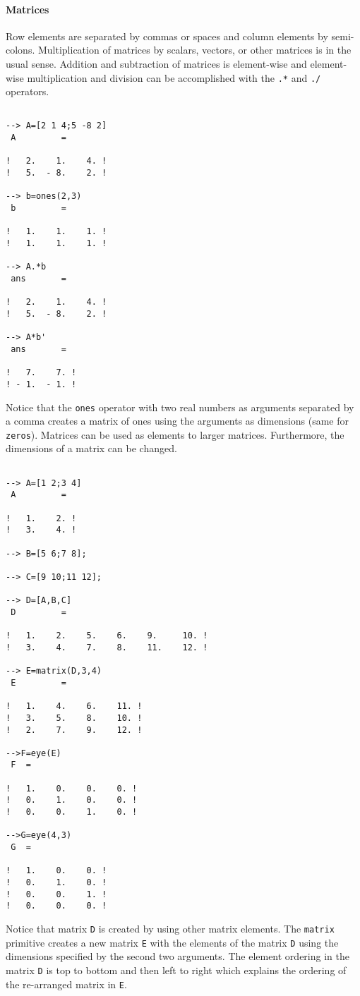 \paragraph{Matrices}
Row elements are separated by commas or spaces
 and column elements by semi-colons.  Multiplication
of matrices by scalars, vectors, or other matrices is in the usual
sense.  Addition and
subtraction of matrices is element-wise and element-wise
multiplication and division can be accomplished with the {\tt .*}
and {\tt ./} operators.
\begin{verbatim}
 
--> A=[2 1 4;5 -8 2]
 A         =
 
!   2.    1.    4. !
!   5.  - 8.    2. !
 
--> b=ones(2,3)
 b         =
 
!   1.    1.    1. !
!   1.    1.    1. !
 
--> A.*b
 ans       =
 
!   2.    1.    4. !
!   5.  - 8.    2. !
 
--> A*b'
 ans       =
 
!   7.    7. !
! - 1.  - 1. !
\end{verbatim}
Notice that the {\tt ones}
operator with two real numbers as arguments separated
by a comma creates a matrix of ones using the arguments as
dimensions (same for {\tt zeros}).
Matrices can be used as elements to larger 
matrices.  Furthermore,
the dimensions of a matrix can be changed.
\begin{verbatim}
 
--> A=[1 2;3 4]
 A         =
 
!   1.    2. !
!   3.    4. !
 
--> B=[5 6;7 8];
 
--> C=[9 10;11 12];
 
--> D=[A,B,C]
 D         =
 
!   1.    2.    5.    6.    9.     10. !
!   3.    4.    7.    8.    11.    12. !
 
--> E=matrix(D,3,4)
 E         =
 
!   1.    4.    6.    11. !
!   3.    5.    8.    10. !
!   2.    7.    9.    12. !

-->F=eye(E)
 F  =
 
!   1.    0.    0.    0. !
!   0.    1.    0.    0. !
!   0.    0.    1.    0. !
 
-->G=eye(4,3)
 G  =
 
!   1.    0.    0. !
!   0.    1.    0. !
!   0.    0.    1. !
!   0.    0.    0. !

\end{verbatim}
Notice that matrix {\tt D} is created by using other matrix
elements.  The {\tt matrix} 
primitive creates a new matrix {\tt E} with the elements of the
matrix {\tt D} using
the dimensions specified by the second two arguments.  The element
ordering in the matrix {\tt D} is top to bottom and then left to right
which explains the ordering of the re-arranged matrix in {\tt E}.


